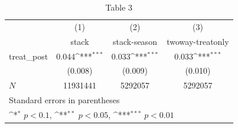 \begin{table}[htbp]\centering
\def\sym#1{\ifmmode^{#1}\else\(^{#1}\)\fi}
\caption{Table 3}
\begin{tabular}{l*{3}{c}}
\hline\hline
            &\multicolumn{1}{c}{(1)}&\multicolumn{1}{c}{(2)}&\multicolumn{1}{c}{(3)}\\
            &\multicolumn{1}{c}{stack}&\multicolumn{1}{c}{stack-season}&\multicolumn{1}{c}{twoway-treatonly}\\
\hline
treat\_post  &       0.044\sym{***}&       0.033\sym{***}&       0.033\sym{***}\\
            &     (0.008)         &     (0.009)         &     (0.010)         \\
\hline
\(N\)       &    11931441         &     5292057         &     5292057         \\
\hline\hline
\multicolumn{4}{l}{\footnotesize Standard errors in parentheses}\\
\multicolumn{4}{l}{\footnotesize \sym{*} \(p<0.1\), \sym{**} \(p<0.05\), \sym{***} \(p<0.01\)}\\
\end{tabular}
\end{table}
